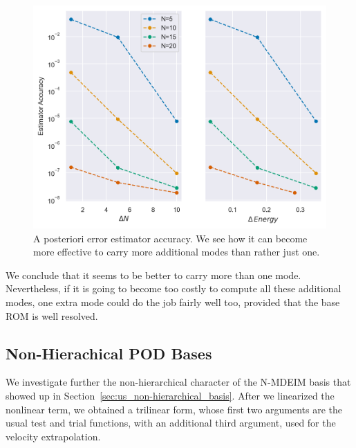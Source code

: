 \documentclass[../../thesis.tex]{subfiles}
\begin{document}
\begin{figure}[h]
    \centering
    \includegraphics[width=1\columnwidth]{research_project/piston/figures/rb_certification/estimator_accuracy.png}
    \caption{A posteriori error estimator accuracy.
    We see how it can become more effective to carry more additional modes than rather just one.}
    \label{fig:estimator_accuracy}
\end{figure}
We conclude that it seems to be better to carry more than one mode.
Nevertheless, if it is going to become too costly to compute all these additional modes,
one extra mode could do the job fairly well too, provided that the base ROM is well resolved.

\subsection{Non-Hierachical POD Bases}
\label{sec:nonhierachical_pod_bases}
We investigate further the non-hierarchical character of the N-MDEIM basis
that showed up in Section~\ref{sec:us_non-hierarchical_basis}.
After we linearized the nonlinear term, we obtained a trilinear form,
whose first two arguments are the usual test and trial functions,
with an additional third argument, used for the velocity extrapolation.
\end{document}
